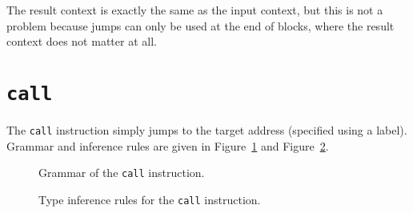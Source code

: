 The result context is exactly the same as the input context, but this is not a problem because jumps can only be used at the end of blocks, where the result context does not matter at all.

\section{\texttt{call}}\label{sec:nstar-instructionset-call}

The \texttt{call} instruction simply jumps to the target address (specified using a label).
Grammar and inference rules are given in Figure~\ref{fig:nstar-instructionset-call-grammar} and Figure~\ref{fig:nstar-instructionset-call-typerules}.

\begin{figure}[H]
  \centering


  \caption{Grammar of the \texttt{call} instruction.}
  \label{fig:nstar-instructionset-call-grammar}
\end{figure}

\begin{figure}[H]
  \centering


  \caption{Type inference rules for the \texttt{call} instruction.}
  \label{fig:nstar-instructionset-call-typerules}
\end{figure}

